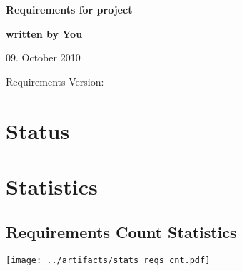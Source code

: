 \documentclass{report}
\begin{document}
\thispagestyle{empty}

\mbox{}

\vfill

{\LARGE\textbf{Requirements for project}}

\vfill

{\Large\textbf{written by You}}

\vfill

09. October 2010

\vfill

Requirements Version: 

\vfill

\newpage

\tableofcontents

\newpage

\chapter{Status}




\chapter{Statistics}
\section{Requirements Count Statistics}
\texttt{[image: ../artifacts/stats\_reqs\_cnt.pdf]}
\end{document}
